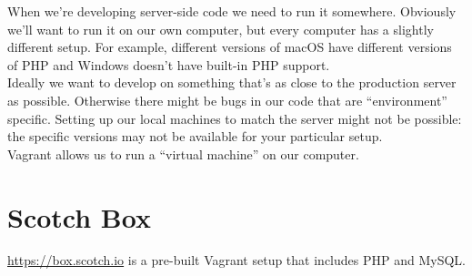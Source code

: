 When we're developing server-side code we need to run it somewhere. Obviously we'll want to run it on our own computer, but every computer has a slightly different setup. For example, different versions of macOS have different versions of PHP and Windows doesn't have built-in PHP support.
\\

Ideally we want to develop on something that's as close to the production server as possible. Otherwise there might be bugs in our code that are ``environment'' specific. Setting up our local machines to match the server might not be possible: the specific versions may not be available for your particular setup.
\\

Vagrant allows us to run a ``virtual machine'' on our computer.


\section{Scotch Box}

\href{Scotch Box}{https://box.scotch.io} is a pre-built Vagrant setup that includes PHP and MySQL.
